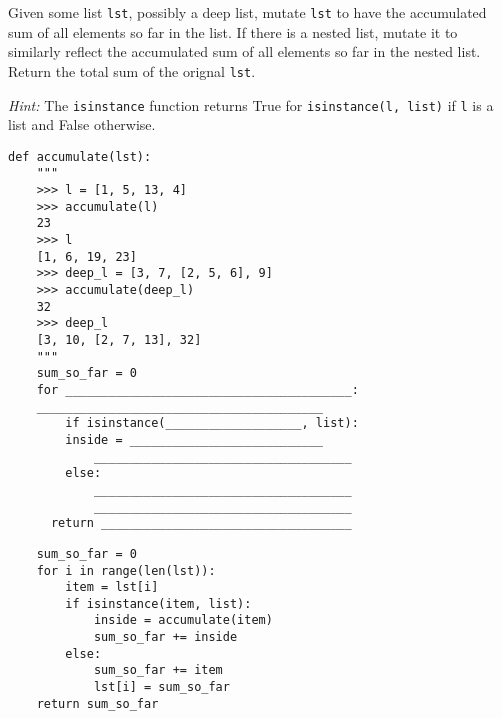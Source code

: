 \question Given some list \texttt{lst}, possibly a deep list, mutate \texttt{lst} to have the accumulated sum of all elements so far in the list. If there is a nested list, mutate it to similarly reflect the accumulated sum of all elements so far in the nested list. Return the total sum of the orignal \texttt{lst}.

\emph{Hint:} The \lstinline$isinstance$ function returns True for \lstinline$isinstance(l, list)$ if \texttt{l} is a list and False otherwise.

\begin{lstlisting}
def accumulate(lst):
    """
    >>> l = [1, 5, 13, 4]
    >>> accumulate(l)
    23
    >>> l
    [1, 6, 19, 23]
    >>> deep_l = [3, 7, [2, 5, 6], 9]
    >>> accumulate(deep_l)
    32
    >>> deep_l
    [3, 10, [2, 7, 13], 32]
    """
    sum_so_far = 0
    for ________________________________________:
	________________________________________
        if isinstance(___________________, list):
	    inside = ___________________________
            ____________________________________
        else:
            ____________________________________
            ____________________________________
      return ___________________________________
\end{lstlisting}

\begin{solution}[1in]
\begin{lstlisting}
    sum_so_far = 0
    for i in range(len(lst)):
        item = lst[i]
        if isinstance(item, list):
            inside = accumulate(item)
            sum_so_far += inside
        else:
            sum_so_far += item
            lst[i] = sum_so_far
    return sum_so_far
\end{lstlisting}
\end{solution}
